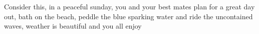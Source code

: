 Consider this, in a peaceful sunday, you and your best mates plan for a great day out, bath on the beach, peddle the blue sparking water and ride the uncontained waves, weather is beautiful and you all enjoy